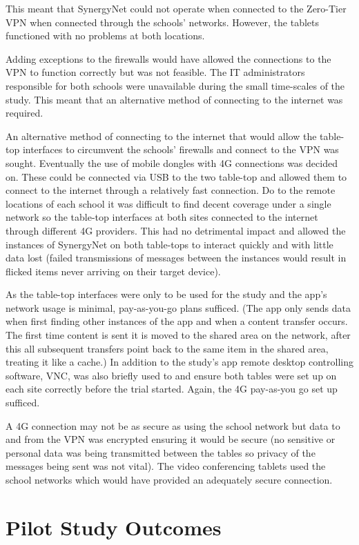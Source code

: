 \documentclass[a4paper,11pt]{article}
\begin{document}
This meant that SynergyNet could not operate when connected to the Zero-Tier VPN when connected through the schools’ networks.
However, the tablets functioned with no problems at both locations.

Adding exceptions to the firewalls would have allowed the connections to the VPN to function correctly but was not feasible.
The IT administrators responsible for both schools were unavailable during the small time-scales of the study.
This meant that an alternative method of connecting to the internet was required.

An alternative method of connecting to the internet that would allow the table-top interfaces to circumvent the schools’ firewalls and connect to the VPN was sought.
Eventually the use of mobile dongles with 4G connections was decided on.
These could be connected via USB to the two table-top and allowed them to connect to the internet through a relatively fast connection.
Do to the remote locations of each school it was difficult to find decent coverage under a single network so the table-top interfaces at both sites connected to the internet through different 4G providers.
This had no detrimental impact and allowed the instances of SynergyNet on both table-tops to interact quickly and with little data lost (failed transmissions of messages between the instances would result in flicked items never arriving on their target device).

As the table-top interfaces were only to be used for the study and the app’s network usage is minimal, pay-as-you-go plans sufficed.
(The app only sends data when first finding other instances of the app and when a content transfer occurs.
The first time content is sent it is moved to the shared area on the network, after this all subsequent transfers point back to the same item in the shared area, treating it like a cache.) In addition to the study’s app remote desktop controlling software, VNC, was also briefly used to and ensure both tables were set up on each site correctly before the trial started.
Again, the 4G pay-as-you go set up sufficed.

A 4G connection may not be as secure as using the school network but data to and from the VPN was encrypted ensuring it would be secure (no sensitive or personal data was being transmitted between the tables so privacy of the messages being sent was not vital).
The video conferencing tablets used the school networks which would have provided an adequately secure connection.


\section{Pilot Study Outcomes} 
\end{document}
